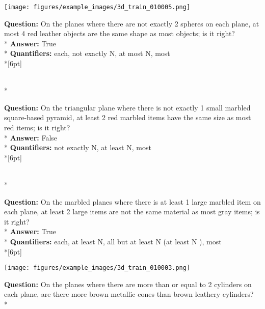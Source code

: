\begin{figure*}  
\begin{minipage}{0.48\textwidth}
    \texttt{[image: figures/example\_images/3d\_train\_010005.png]}
    \begin{minipage}[t][2.2cm][t]{1\textwidth}
      \footnotesize
      \textbf{Question:} On the planes where there are not exactly 2 spheres on each plane, at most 4 red leather objects are the same shape as most objects; is it right? \\*
      \textbf{Answer:}  True \\*
      \textbf{Quantifiers:}  each, not exactly N, at most N, most\\*[6pt]
    \end{minipage}\\*
    \begin{minipage}[t][2.2cm][t]{1\textwidth}
      \footnotesize
      \textbf{Question:} On the triangular plane where there is not exactly 1 small marbled square-based pyramid, at least 2 red marbled items have the same size as most red items; is it right? \\*
      \textbf{Answer:} False \\*
      \textbf{Quantifiers:}  not exactly N, at least N, most\\*[6pt]
    \end{minipage}\\*
    \begin{minipage}[t][2.2cm][t]{1\textwidth}
      \footnotesize
      \textbf{Question:} On the marbled planes where there is at least 1 large marbled item on each plane, at least 2 large items are not the same material as most gray items; is it right? \\*
      \textbf{Answer:} True \\*
      \textbf{Quantifiers:} each, at least N, all but at least N (at least N ), most \\*[6pt]
    \end{minipage}
  \end{minipage}
  \hspace{3.5mm}
  \begin{minipage}{0.48\textwidth}
    \texttt{[image: figures/example\_images/3d\_train\_010003.png]}
    \begin{minipage}[t][2.2cm][t]{1\textwidth}
      \footnotesize
      \textbf{Question:}  On the planes where there are more than or equal to 2 cylinders on each plane, are there more brown metallic cones than brown leathery cylinders? \\*

\end{minipage}
\end{minipage}
\end{figure*}
